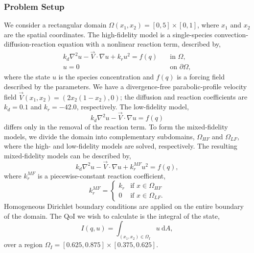 \subsubsection{Problem Setup} \label{sec:cdvcdrSetup}
%
We consider a rectangular domain $\Omega(x_1,x_2)=[0,5]\times[0,1]$, where $x_1$ and $x_2$ are the spatial coordinates. The high-fidelity model is a single-species convection-diffusion-reaction equation with a nonlinear reaction term, described by,
%
\begin{subequations}
\label{eq:cdvcdrHF}
\begin{align}
k_d\nabla^2 u - \vec{V}\cdot\nabla u + k_ru^2 = f(q) \quad &\text{in } \Omega, \label{eq:cdvcdrHF_int} \\
u = 0 \quad &\text{on } \partial \Omega, \label{eq:cdvcdrHF_bdry}
\end{align}
\end{subequations}
%
where the state $u$ is the species concentration and $f(q)$ is a forcing field described by the parameters. We have a divergence-free parabolic-profile velocity field $\vec{V}(x_1,x_2) = (2x_2(1-x_2),0)$; the diffusion and reaction coefficients are $k_d = 0.1$ and $k_r = -42.0$, respectively. The low-fidelity model,
%
\begin{equation}
k_d\nabla^2 u - \vec{V}\cdot\nabla u = f(q)
\end{equation}
%
differs only in the removal of the reaction term. To form the mixed-fidelity models, we divide the domain into complementary subdomains, $\Omega_{HF}$ and $\Omega_{LF}$, where the high- and low-fidelity models are solved, respectively. The resulting mixed-fidelity models can be described by,
%
\begin{equation}
k_d\nabla^2 u - \vec{V}\cdot\nabla u + k^{MF}_ru^2= f(q),
\end{equation}
%
where $k^{MF}_r$ is a piecewise-constant reaction coefficient,
%
\begin{equation}
k^{MF}_r=
\begin{cases}
k_r & \textrm{if }x\in\Omega_{HF} \\
0 & \textrm{if }x\in\Omega_{LF}.
\end{cases}
\end{equation}
%
Homogeneous Dirichlet boundary conditions are applied on the entire boundary of the domain. The QoI we wish to calculate is the integral of the state,
%
\begin{equation}
I(q,u)=\int_{(x_1,x_2)\in \Omega_I} u \:\textrm{d}A,
\end{equation}
%
over a region $\Omega_I=[0.625,0.875]\times[0.375,0.625]$.

